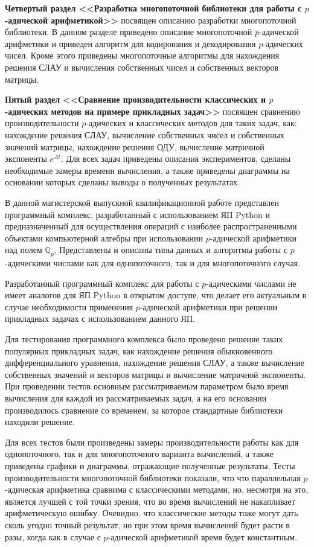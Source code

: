 \documentclass[master, och, autoref, times]{sty/SCWorks}
\theoremstyle{plain}
\theoremstyle{definition}
\numberwithin{equation}{section}
\begin{document}
\textbf{Четвертый раздел <<Разработка многопоточной библиотеки для работы с $p$-адической арифметикой>>} посвящен описанию разработки многопоточной библиотеки. В данном разделе приведено описание многопоточной $p$-адической арифметики и приведен алгоритм для кодирования и декодирования $p$-адических чисел. Кроме этого приведены многопоточные алгоритмы для нахождения решения СЛАУ и вычисления собственных чисел и собственных векторов матрицы.

\textbf{Пятый раздел <<Сравнение производительности классических и $p$-адических методов на примере прикладных задач>>} посвящен сравнению производительности $p$-адических и классических методов для таких задач, как: нахождение решения СЛАУ, вычисление собственных чисел и собственных значений матрицы, нахождение решения ОДУ, вычисление матричной экспоненты $e^{At}$. Для всех задач приведены описания экспериментов, сделаны необходимые замеры времени вычисления, а также приведены диаграммы на основании которых сделаны выводы о полученных результатах.


\conclusion

В данной магистерской выпускной квалификационной работе представлен программный комплекс, разработанный с использованием ЯП Python и предназначенный для осуществления операций с наиболее распространенными объектами компьютерной алгебры при использовании $p$-адической арифметики над полем $\mathbb{Q}_p$. Представлены и описаны типы данных и алгоритмы работы с $p$-адическими числами как для однопоточного, так и для многопоточного случая.

Разработанный программный комплекс для работы с $p$-адическими числами не имеет аналогов для ЯП Python в открытом доступе, что делает его актуальным в случае необходимости применения $p$-адической арифметики при решении прикладных задачах с использованием данного ЯП.

Для тестирования программного комплекса было проведено решение таких популярных прикладных задач, как нахождение решения обыкновенного дифференциального уравнения, нахождение решения СЛАУ, а также вычисление собственных значений и векторов матрицы и вычисление матричной экспоненты. При проведении тестов  основным рассматриваемым параметром было время вычисления для каждой из рассматриваемых задач, а на его основании производилось сравнение со временем, за которое стандартные библиотеки находили решение.

Для всех тестов были произведены замеры производительности работы как для однопоточного, так и для многопоточного варианта вычислений, а также приведены графики и диаграммы, отражающие полученные результаты. Тесты производительности многопоточной библиотеки показали, что что параллельная $p$-адическая арифметика сравнима с классическими методами, но, несмотря на это, является лучшей с той точки зрения, что во время вычислений не накапливает арифметическую ошибку. Очевидно, что классические методы тоже могут дать сколь угодно точный результат, но при этом время вычислений будет расти в разы, когда как в случае с $p$-адической арифметикой время будет константным.
\end{document}
